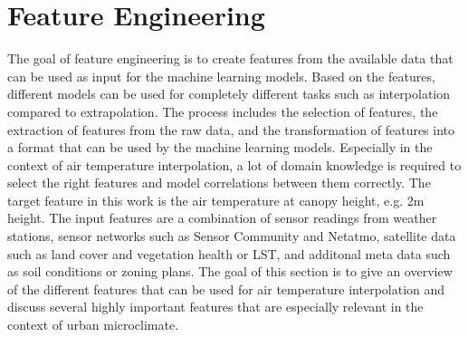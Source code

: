 \section{Feature Engineering}
\label{sec:feature_engineering}

The goal of feature engineering is to create features from the available data that can be used as input for the machine learning models. Based on the features, different models can be used for completely different tasks such as interpolation compared to extrapolation. The process includes the selection of features, the extraction of features from the raw data, and the transformation of features into a format that can be used by the machine learning models.
Especially in the context of air temperature interpolation, a lot of domain knowledge is required to select the right features and model correlations between them correctly. The target feature in this work is the air temperature at canopy height, e.g. 2m height. The input features are a combination of sensor readings from weather stations, sensor networks such as Sensor Community and Netatmo, satellite data such as land cover and vegetation health or LST, and additonal meta data such as soil conditions or zoning plans. The goal of this section is to give an overview of the different features that can be used for air temperature interpolation and discuss several highly important features that are especially relevant in the context of urban microclimate.


